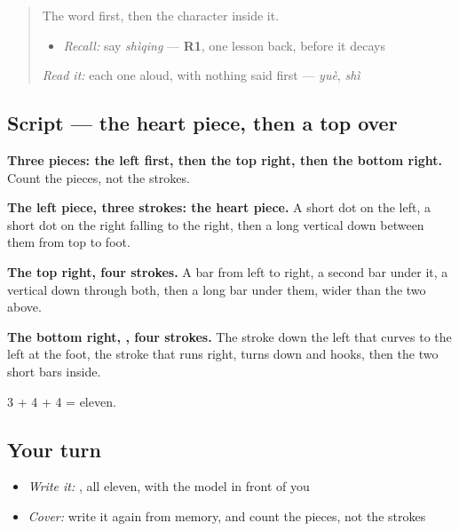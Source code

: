 \begin{quote}
The word first, then the character inside it.

\begin{itemize}
\raggedright
  \item \emph{Recall:} say \emph{shìqing} — \textbf{R1}, one lesson back, before it decays
\end{itemize}

\begin{quote}
 
\end{quote}

\emph{Read it:} each one aloud, with nothing said first — \emph{yuè}, \emph{shì}
\end{quote}

\subsection*{Script — the heart piece, then a top over }

\begin{quote}
\end{quote}

\textbf{Three pieces: the left first, then the top right, then the bottom right.} Count the pieces, not the strokes.

\textbf{The left piece, three strokes: the heart piece.} A short dot on the left, a short dot on the right falling to the right, then a long vertical down between them from top to foot.

\textbf{The top right, four strokes.} A bar from left to right, a second bar under it, a vertical down through both, then a long bar under them, wider than the two above.

\textbf{The bottom right, , four strokes.} The stroke down the left that curves to the left at the foot, the stroke that runs right, turns down and hooks, then the two short bars inside.

3 + 4 + 4 = eleven.

\subsection*{Your turn}
\begin{itemize}
\raggedright
  \item \emph{Write it:} , all eleven, with the model in front of you
  \item \emph{Cover:} write it again from memory, and count the pieces, not the strokes
\end{itemize}

